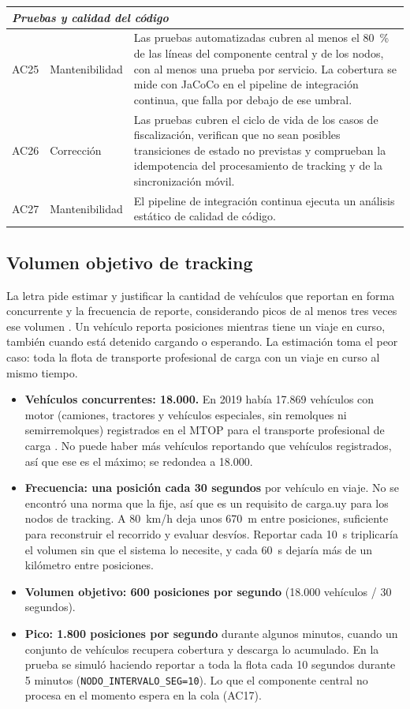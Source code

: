 \begin{longtable}{|p{1.3cm}|p{2.7cm}|p{11.5cm}|}
    \hline
    \multicolumn{3}{|l|}{\textit{Pruebas y calidad del código}} \\
    \hline
    AC25 & Mantenibilidad & Las pruebas automatizadas cubren al menos el 80~\% de las líneas del componente central y de los nodos, con al menos una prueba por servicio. La cobertura se mide con JaCoCo en el pipeline de integración continua, que falla por debajo de ese umbral. \\
    \hline
    AC26 & Corrección & Las pruebas cubren el ciclo de vida de los casos de fiscalización, verifican que no sean posibles transiciones de estado no previstas y comprueban la idempotencia del procesamiento de tracking y de la sincronización móvil. \\
    \hline
    AC27 & Mantenibilidad & El pipeline de integración continua ejecuta un análisis estático de calidad de código. \\
    \hline
\end{longtable}

\subsection{Volumen objetivo de tracking}\label{sec:volumen-objetivo}

La letra pide estimar y justificar la cantidad de vehículos que reportan en forma concurrente y la frecuencia de reporte, considerando picos de al menos tres veces ese volumen \cite{LINS2026}. Un vehículo reporta posiciones mientras tiene un viaje en curso, también cuando está detenido cargando o esperando. La estimación toma el peor caso: toda la flota de transporte profesional de carga con un viaje en curso al mismo tiempo.

\begin{itemize}
    \item \textbf{Vehículos concurrentes: 18.000.} En 2019 había 17.869 vehículos con motor (camiones, tractores y vehículos especiales, sin remolques ni semirremolques) registrados en el MTOP para el transporte profesional de carga \cite{BID2022}. No puede haber más vehículos reportando que vehículos registrados, así que ese es el máximo; se redondea a 18.000.
    \item \textbf{Frecuencia: una posición cada 30 segundos} por vehículo en viaje. No se encontró una norma que la fije, así que es un requisito de carga.uy para los nodos de tracking. A 80~km/h deja unos 670~m entre posiciones, suficiente para reconstruir el recorrido y evaluar desvíos. Reportar cada 10~s triplicaría el volumen sin que el sistema lo necesite, y cada 60~s dejaría más de un kilómetro entre posiciones.
    \item \textbf{Volumen objetivo: 600 posiciones por segundo} (18.000 vehículos / 30 segundos).
    \item \textbf{Pico: 1.800 posiciones por segundo} durante algunos minutos, cuando un conjunto de vehículos recupera cobertura y descarga lo acumulado. En la prueba se simuló haciendo reportar a toda la flota cada 10 segundos durante 5 minutos (\texttt{NODO\_INTERVALO\_SEG=10}). Lo que el componente central no procesa en el momento espera en la cola (AC17).
\end{itemize}

